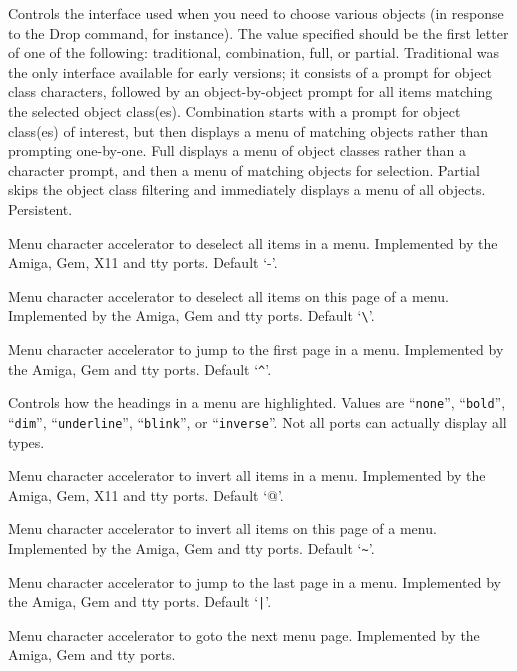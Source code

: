 \item[\ib{menustyle}]
Controls the interface used when you need to choose various objects (in
response to the Drop command, for instance).  The value specified should
be the first letter of one of the following:  traditional, combination,
full, or partial.
Traditional was the only interface available for
early versions; it consists of a prompt for object class characters,
followed by an object-by-object prompt for all items matching the selected
object class(es).
Combination starts with a prompt for object class(es)
of interest, but then displays a menu of matching objects rather than
prompting one-by-one.
Full displays a menu of
object classes rather than a character prompt, and then a menu of matching
objects for selection.
Partial skips the object class filtering and
immediately displays a menu of all objects.
Persistent.
\item[\ib{menu\verb+_+deselect\verb+_+all}]
Menu character accelerator to deselect all items in a menu.
Implemented by the Amiga, Gem, X11 and tty ports.
Default `-'.
\item[\ib{menu\verb+_+deselect\verb+_+page}]
Menu character accelerator to deselect all items on this page of a menu.
Implemented by the Amiga, Gem and tty ports.
Default `\verb+\+'.
\item[\ib{menu\verb+_+first\verb+_+page}]
Menu character accelerator to jump to the first page in a menu.
Implemented by the Amiga, Gem and tty ports.
Default `\verb+^+'.
\item[\ib{menu\verb+_+headings}]
Controls how the headings in a menu are highlighted.
Values are ``{\tt none}'', ``{\tt bold}'', ``{\tt dim}'',
``{\tt underline}'', ``{\tt blink}'', or ``{\tt inverse}''.
Not all ports can actually display all types.
\item[\ib{menu\verb+_+invert\verb+_+all}]
Menu character accelerator to invert all items in a menu.
Implemented by the Amiga, Gem, X11 and tty ports.
Default `@'.
\item[\ib{menu\verb+_+invert\verb+_+page}]
Menu character accelerator to invert all items on this page of a menu.
Implemented by the Amiga, Gem and tty ports.
Default `\verb+~+'.
\item[\ib{menu\verb+_+last\verb+_+page}]
Menu character accelerator to jump to the last page in a menu.
Implemented by the Amiga, Gem and tty ports.
Default `\verb+|+'.
\item[\ib{menu\verb+_+next\verb+_+page}]
Menu character accelerator to goto the next menu page.
Implemented by the Amiga, Gem and tty ports.
